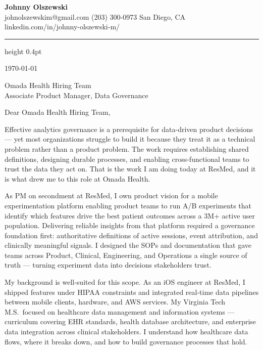 \documentclass[11pt,letterpaper]{article}
\begin{document}
\begin{center}
  {\Large\textbf{Johnny Olszewski}}\\[0.3em]
  {\small johnolszewskim@gmail.com \textbar{} (203) 300-0973 \textbar{} San Diego, CA \textbar{} linkedin.com/in/johnny-olszewski-m/}
\end{center}

\vspace{0.5em}
\hrule height 0.4pt
\vspace{1em}

\today

\vspace{0.5em}

Omada Health Hiring Team\\
Associate Product Manager, Data Governance

\vspace{0.5em}

Dear Omada Health Hiring Team,

Effective analytics governance is a prerequisite for data-driven product decisions — yet most organizations struggle to build it because they treat it as a technical problem rather than a product problem. The work requires establishing shared definitions, designing durable processes, and enabling cross-functional teams to trust the data they act on. That is the work I am doing today at ResMed, and it is what drew me to this role at Omada Health.

As PM on secondment at ResMed, I own product vision for a mobile experimentation platform enabling product teams to run A/B experiments that identify which features drive the best patient outcomes across a 3M+ active user population. Delivering reliable insights from that platform required a governance foundation first: authoritative definitions of active sessions, event attribution, and clinically meaningful signals. I designed the SOPs and documentation that gave teams across Product, Clinical, Engineering, and Operations a single source of truth — turning experiment data into decisions stakeholders trust.

My background is well-suited for this scope. As an iOS engineer at ResMed, I shipped features under HIPAA constraints and integrated real-time data pipelines between mobile clients, hardware, and AWS services. My Virginia Tech M.S.\ focused on healthcare data management and information systems — curriculum covering EHR standards, health database architecture, and enterprise data integration across clinical stakeholders. I understand how healthcare data flows, where it breaks down, and how to build governance processes that hold.
\end{document}
